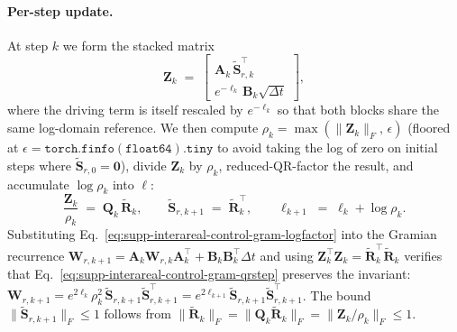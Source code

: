 \paragraph{Per-step update.}
At step $k$ we form the stacked matrix
\begin{equation}
\mathbf{Z}_{k} \;=\; \begin{bmatrix}\mathbf{A}_{k}\,\tilde{\mathbf{S}}_{r,k}^{\!\top}\\ e^{-\ell_{k}}\,\mathbf{B}_{k}\sqrt{\Delta t}\end{bmatrix},
\end{equation}
where the driving term is itself rescaled by $e^{-\ell_{k}}$ so that both blocks share the same log-domain reference. We then compute $\rho_{k}=\max(\|\mathbf{Z}_{k}\|_{F},\,\epsilon)$ (floored at $\epsilon=\mathtt{torch.finfo(float64).tiny}$ to avoid taking the log of zero on initial steps where $\tilde{\mathbf{S}}_{r,0}=\mathbf{0}$), divide $\mathbf{Z}_{k}$ by $\rho_{k}$, reduced-QR-factor the result, and accumulate $\log\rho_{k}$ into $\ell$:
\begin{equation}
\frac{\mathbf{Z}_{k}}{\rho_{k}} \;=\; \mathbf{Q}_{k}\,\tilde{\mathbf{R}}_{k},\qquad \tilde{\mathbf{S}}_{r,k+1}\;=\;\tilde{\mathbf{R}}_{k}^{\!\top},\qquad \ell_{k+1}\;=\;\ell_{k}+\log\rho_{k}.
\label{eq:supp-interareal-control-gram-qrstep}
\end{equation}
Substituting Eq.~\ref{eq:supp-interareal-control-gram-logfactor} into the Gramian recurrence $\mathbf{W}_{r,k+1}=\mathbf{A}_{k}\mathbf{W}_{r,k}\mathbf{A}_{k}^{\!\top}+\mathbf{B}_{k}\mathbf{B}_{k}^{\!\top}\Delta t$ and using $\mathbf{Z}_{k}^{\!\top}\mathbf{Z}_{k}=\tilde{\mathbf{R}}_{k}^{\!\top}\tilde{\mathbf{R}}_{k}$ verifies that Eq.~\ref{eq:supp-interareal-control-gram-qrstep} preserves the invariant: $\mathbf{W}_{r,k+1}=e^{2\ell_{k}}\rho_{k}^{2}\,\tilde{\mathbf{S}}_{r,k+1}\tilde{\mathbf{S}}_{r,k+1}^{\!\top}=e^{2\ell_{k+1}}\tilde{\mathbf{S}}_{r,k+1}\tilde{\mathbf{S}}_{r,k+1}^{\!\top}$. The bound $\|\tilde{\mathbf{S}}_{r,k+1}\|_{F}\leq 1$ follows from $\|\tilde{\mathbf{R}}_{k}\|_{F}=\|\mathbf{Q}_{k}\tilde{\mathbf{R}}_{k}\|_{F}=\|\mathbf{Z}_{k}/\rho_{k}\|_{F}\leq 1$.

